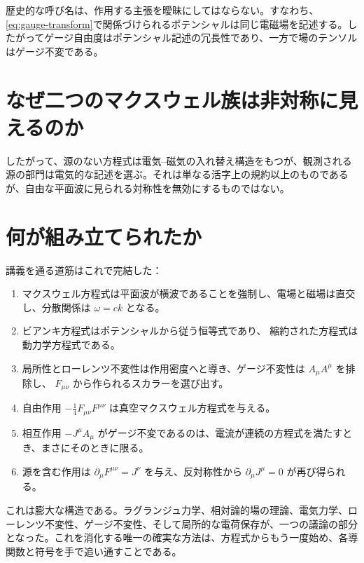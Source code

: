 歴史的な呼び名は、作用する主張を曖昧にしてはならない。すなわち、\eqref{eq:gauge-transform}で関係づけられるポテンシャルは同じ電磁場を記述する。したがってゲージ自由度はポテンシャル記述の冗長性であり、一方で場のテンソルはゲージ不変である。

\section{なぜ二つのマクスウェル族は非対称に見えるのか}

\begin{classroomqa}
\end{classroomqa}

したがって、源のない方程式は電気--磁気の入れ替え構造をもつが、観測される源の部門は電気的な記述を選ぶ。それは単なる活字上の規約以上のものであるが、自由な平面波に見られる対称性を無効にするものではない。

\section{何が組み立てられたか}

講義を通る道筋はこれで完結した：
\begin{enumerate}
\item マクスウェル方程式は平面波が横波であることを強制し、電場と磁場は直交し、分散関係は
      \(\omega=ck\) となる。
\item ビアンキ方程式はポテンシャルから従う恒等式であり、
      縮約された方程式は動力学方程式である。
\item 局所性とローレンツ不変性は作用密度へと導き、ゲージ不変性は \(A_\mu A^\mu\) を排除し、
      \(F_{\mu\nu}\) から作られるスカラーを選び出す。
\item 自由作用
      \(-\tfrac14F_{\mu\nu}F^{\mu\nu}\) は真空マクスウェル方程式を与える。
\item 相互作用 \(-J^\mu A_\mu\) がゲージ不変であるのは、電流が連続の方程式を満たすとき、まさにそのときに限る。
\item 源を含む作用は
      \(\partial_\mu F^{\mu\nu}=J^\nu\) を与え、反対称性から
      \(\partial_\mu J^\mu=0\) が再び得られる。
\end{enumerate}

これは膨大な構造である。ラグランジュ力学、相対論的場の理論、電気力学、ローレンツ不変性、ゲージ不変性、そして局所的な電荷保存が、一つの議論の部分となった。これを消化する唯一の確実な方法は、方程式からもう一度始め、各導関数と符号を手で追い通すことである。
